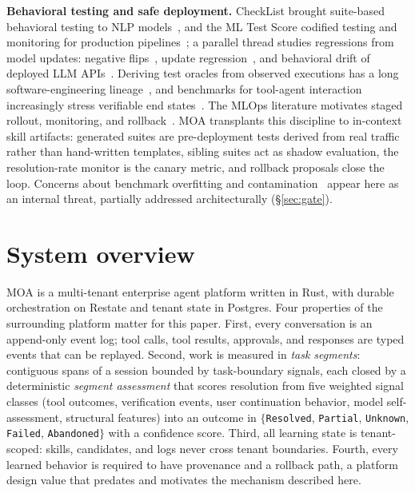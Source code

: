 \documentclass{article}
\newcommand{\moa}{MOA}
\newcommand{\code}[1]{\texttt{\small #1}}
\begin{document}
\textbf{Behavioral testing and safe deployment.} CheckList brought suite-based behavioral testing to NLP models~\citep{ribeiro2020checklist}, and the ML Test Score codified testing and monitoring for production pipelines~\citep{breck2017mltestscore}; a parallel thread studies regressions from model updates: negative flips~\citep{yan2021pctraining}, update regression~\citep{cai2022updateregression}, and behavioral drift of deployed LLM APIs~\citep{chen2023chatgptbehavior}. Deriving test oracles from observed executions has a long software-engineering lineage~\citep{pacheco2007randoop}, and benchmarks for tool-agent interaction increasingly stress verifiable end states~\citep{yao2024taubench}. The MLOps literature motivates staged rollout, monitoring, and rollback~\citep{sculley2015hidden, paleyes2022challenges, shankar2022operationalizing, amershi2019se4ml}. \moa{} transplants this discipline to in-context skill artifacts: generated suites are pre-deployment tests derived from real traffic rather than hand-written templates, sibling suites act as shadow evaluation, the resolution-rate monitor is the canary metric, and rollback proposals close the loop. Concerns about benchmark overfitting and contamination~\citep{sainz2023contamination, li2023taskcontamination, kapoor2024aiagents} appear here as an internal threat, partially addressed architecturally (\S\ref{sec:gate}).

\section{System overview}
\label{sec:system}

\moa{} is a multi-tenant enterprise agent platform written in Rust, with durable orchestration on Restate and tenant state in Postgres. Four properties of the surrounding platform matter for this paper. First, every conversation is an append-only event log; tool calls, tool results, approvals, and responses are typed events that can be replayed. Second, work is measured in \emph{task segments}: contiguous spans of a session bounded by task-boundary signals, each closed by a deterministic \emph{segment assessment} that scores resolution from five weighted signal classes (tool outcomes, verification events, user continuation behavior, model self-assessment, structural features) into an outcome in $\{$\code{Resolved}, \code{Partial}, \code{Unknown}, \code{Failed}, \code{Abandoned}$\}$ with a confidence score. Third, all learning state is tenant-scoped: skills, candidates, and logs never cross tenant boundaries. Fourth, every learned behavior is required to have provenance and a rollback path, a platform design value that predates and motivates the mechanism described here.
\end{document}
